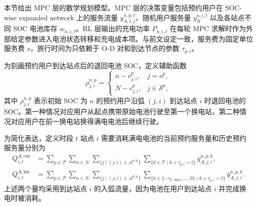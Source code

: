 \documentclass[12pt,hyperref,a4paper,UTF8]{ctexart}
\begin{document}
本节给出 MPC 层的数学规划模型。MPC 层的决策变量包括预约用户在 SOC-wise expanded network 上的服务流量 $y_{A,i,j}^{n,p,t}$、随机用户服务量 $y_R^{n,i,t}$ 以及各站点不同 SOC 电池库存 $w_{n,i,t}$。RL 层输出的充电功率 $P_{n,i,t}$ 在每轮 MPC 求解时作为外部给定参数进入电池状态转移和充电成本项。与前文设定一致，服务费为固定单位服务费 $s$，旅行时间为只依赖于 O-D 对和到达节点的参数 $\tau_{p,i}$。

为刻画预约用户到达站点后的退回电池 SOC，定义辅助函数
\begin{equation}
\rho_{j,i}^{n,p}=
\begin{cases}
 n-v_{j,i}^{p}, & j=o^p,\\
 N-v_{j,i}^{p}, & j\in\mathcal{S}^{p},
\end{cases}
\label{eq:return_soc}
\end{equation}
其中 $\rho_{j,i}^{n,p}$ 表示初始 SOC 为 $n$ 的预约用户沿弧 $(j,i)$ 到达站点 $i$ 时退回电池的 SOC。第一种情况对应用户从起点携带原始电池行驶至第一个换电站，第二种情况对应用户在前一换电站换得满电电池后继续行驶。

为简化表达，定义时段 $t$ 站点 $i$ 需要消耗满电电池的当前预约服务量和历史预约服务量分别为
\begin{align}
Q_{i,t}^{A,\mathrm{cur}}
&=
\sum_{p\in\mathcal{P}}
\sum_{n\in\mathcal{N}}
\sum_{\{j\mid (j,i)\in\mathcal{A}^{n,p}\}}
\sum_{\{k\in\mathcal{T}\mid k+\tau_{p,i}=t\}}
y_{A,j,i}^{n,p,k},
\label{eq:current_reservation_swap}\\
Q_{i,t}^{A,\mathrm{his}}
&=
\sum_{p\in\mathcal{P}}
\sum_{n\in\mathcal{N}}
\sum_{\{j\mid (j,i)\in\mathcal{A}^{n,p}\}}
\sum_{\{k\in\{-\tau_{p,\max},\ldots,0\}\mid k+\tau_{p,i}=t\}}
\bar{y}_{A,j,i}^{n,p,k}.
\label{eq:historical_reservation_swap}
\end{align}
上述两个量均采用到达站点 $i$ 的入弧流量，因为电池在用户到达站点 $i$ 并完成换电时被消耗。
\end{document}
